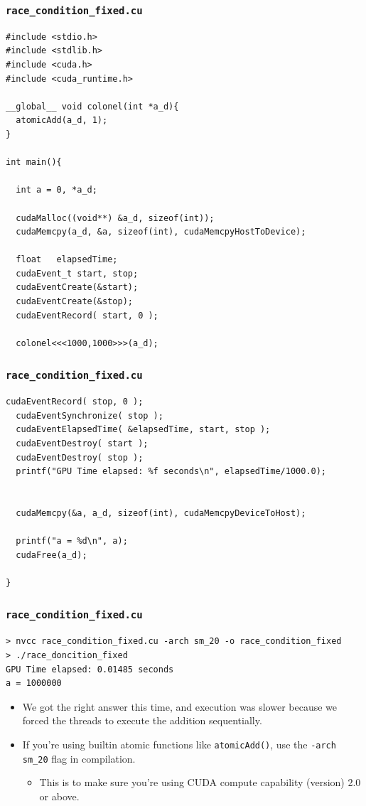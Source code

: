 \documentclass[handout]{beamer}
\numberwithin{equation}{section}
\begin{document}
\begin{frame}[fragile]
\frametitle{{\tt race\_condition\_fixed.cu}} \lstset{basicstyle=\tiny}
\begin{lstlisting}[name=rfix]
#include <stdio.h>
#include <stdlib.h>
#include <cuda.h>
#include <cuda_runtime.h> 

__global__ void colonel(int *a_d){
  atomicAdd(a_d, 1);
}

int main(){

  int a = 0, *a_d;
  
  cudaMalloc((void**) &a_d, sizeof(int));
  cudaMemcpy(a_d, &a, sizeof(int), cudaMemcpyHostToDevice);

  float   elapsedTime;
  cudaEvent_t start, stop;
  cudaEventCreate(&start);
  cudaEventCreate(&stop);
  cudaEventRecord( start, 0 );

  colonel<<<1000,1000>>>(a_d); 
\end{lstlisting}
\end{frame}

\begin{frame}[fragile]
\frametitle{{\tt race\_condition\_fixed.cu}} \lstset{basicstyle=\tiny}
\begin{lstlisting}[name=rfix]
  cudaEventRecord( stop, 0 );
  cudaEventSynchronize( stop );
  cudaEventElapsedTime( &elapsedTime, start, stop );
  cudaEventDestroy( start );
  cudaEventDestroy( stop );
  printf("GPU Time elapsed: %f seconds\n", elapsedTime/1000.0);
  
  
  cudaMemcpy(&a, a_d, sizeof(int), cudaMemcpyDeviceToHost);

  printf("a = %d\n", a);
  cudaFree(a_d);

}
\end{lstlisting}
\end{frame}

\begin{frame}[fragile]
\frametitle{{\tt race\_condition\_fixed.cu}} 
\begin{lstlisting}
> nvcc race_condition_fixed.cu -arch sm_20 -o race_condition_fixed
> ./race_doncition_fixed
GPU Time elapsed: 0.01485 seconds
a = 1000000
\end{lstlisting}
\begin{itemize}
\pause \item We got the right answer this time, and execution was slower because we forced the threads to execute the addition sequentially.
\pause \item If you're using builtin atomic functions like {\tt atomicAdd()}, use the {\tt -arch sm\_20} flag in compilation. 
\begin{itemize}
\pause \item This is to make sure you're using CUDA compute capability (version) 2.0 or above.
\end{itemize}
\end{itemize}
\end{frame}
\end{document}
